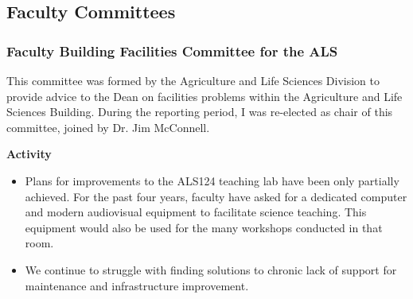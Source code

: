 \begin{comment}
\raggedright\vspace{2mm}\textbf{Activity}
\begin{itemize}
\item According to the UOG Registrar, I taught 4 courses during the Fanuchanan
semester: AL345, AL345L, BI345, and BI345L. In reality this was a
single course, AL/BI 345 \emph{General Entomology} consisting of two,
one and a half hour lectures and one three hour lab per week. 
\begin{itemize}
\item I built and maintained a web site for this course \cite{moore2017website}
\item In student evaluations for AL345, AL345L, BI345, and BI345L, my scores
were consistently higher than the University and College average \cite{moore2018student}.
\end{itemize}
\item I acted as the major faculty advisor for Mr. Ian Iriarte who is pursuing
a Master's degree in Environmental Science.
\end{itemize}
\raggedright\vspace{2mm}\textbf{Reference(s)}

\begin{btSect}[vancouver]{zotero}
\btPrintCited
\end{btSect}
\newpage{}
\end{btUnit}

\begin{btUnit}
\end{comment}

\subsection{Faculty Committees}

\subsubsection{Faculty Building Facilities Committee for the ALS}

This committee was formed by the Agriculture and Life Sciences Division
to provide advice to the Dean on facilities problems within the Agriculture
and Life Sciences Building. During the reporting period, I was re-elected
as chair of this committee, joined by Dr. Jim McConnell.

\raggedright\vspace{2mm}\textbf{Activity}
\begin{itemize}
	
\item Plans for improvements to the ALS124 teaching lab have been only partially
achieved. For the past four years, faculty have asked for a dedicated
computer and modern audiovisual equipment to facilitate science teaching. This equipment would also be used for the many workshops conducted in that room.

\item We continue to struggle with finding solutions to chronic lack of support for maintenance and infrastructure improvement.

\end{itemize}

